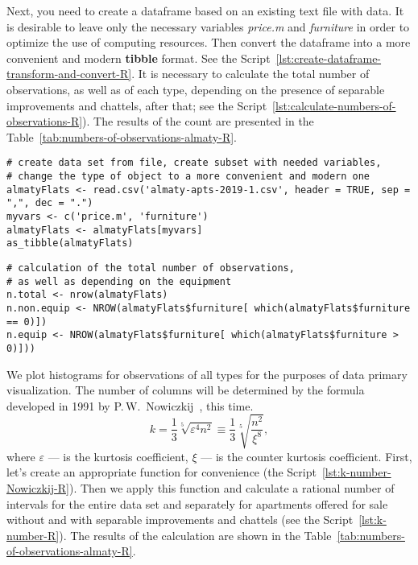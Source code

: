 \documentclass[]{scrreprt}
\begin{document}
Next, you need to create a dataframe based on an existing text file with data. It is desirable to leave only the necessary variables \textit{price.m} and \textit{furniture} in order to optimize the use of computing resources. Then convert the dataframe into a more convenient and modern \textbf{tibble} format. See the Script~\ref{lst:create-dataframe-transform-and-convert-R}. It is necessary to calculate the total number of observations, as well as of each type, depending on the presence of separable improvements and chattels, after that; see the Script~\ref{lst:calculate-numbers-of-observations-R}). The results of the count are presented in the Table~\ref{tab:numbers-of-observations-almaty-R}.
%
\begin{lstlisting}[float=htp, caption = Creating a dataframe and setting it up, firstnumber=1, label= lst:create-dataframe-transform-and-convert-R]
# create data set from file, create subset with needed variables,
# change the type of object to a more convenient and modern one
almatyFlats <- read.csv('almaty-apts-2019-1.csv', header = TRUE, sep = ",", dec = ".")
myvars <- c('price.m', 'furniture')
almatyFlats <- almatyFlats[myvars]
as_tibble(almatyFlats)
\end{lstlisting} 
%
\begin{lstlisting}[float=htp, caption = Counting the number of observations, firstnumber=1, label= lst:calculate-numbers-of-observations-R]
# calculation of the total number of observations,
# as well as depending on the equipment 
n.total <- nrow(almatyFlats)
n.non.equip <- NROW(almatyFlats$furniture[ which(almatyFlats$furniture == 0)])
n.equip <- NROW(almatyFlats$furniture[ which(almatyFlats$furniture > 0)]))
\end{lstlisting}
%
We plot histograms for observations of all types for the purposes of data primary visualization. The number of columns will be determined by the formula developed in 1991 by P.\,W.~Nowiczkij~\cite{Nowiczkij:oczenka-pogresh}, this time.
\begin{equation}\label{eq:k-hist_Nowiczkij}
k = \frac{1}{3}\sqrt[5]{\varepsilon^4 n^2} \equiv \frac{1}{3} \sqrt[5]{\frac{n^2}{\xi^8}}, 
\end{equation}
where $\varepsilon$ --- is the kurtosis coefficient, $\xi$ --- is the counter kurtosis coefficient. First, let's create an appropriate function for convenience  (the Script~\ref{lst:k-number-Nowiczkij-R}). Then we apply this function and calculate a rational number of intervals for the entire data set and separately for apartments offered for sale without and with separable improvements and chattels (see the Script~\ref{lst:k-number-R}). The results of the calculation are shown in the Table~\ref{tab:numbers-of-observations-almaty-R}.
\end{document}
